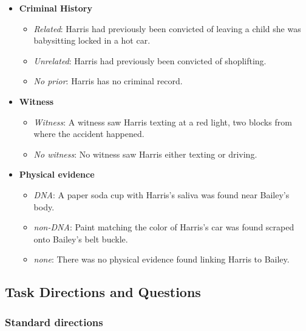 \documentclass[
]{article}
\providecommand{\tightlist}{%
  \setlength{\itemsep}{0pt}\setlength{\parskip}{0pt}}
\begin{document}
\begin{itemize}
\tightlist
\item
  \textbf{Criminal History}

  \begin{itemize}
  \tightlist
  \item
    \emph{Related}: Harris had previously been convicted of leaving a
    child she was babysitting locked in a hot car.
  \item
    \emph{Unrelated}: Harris had previously been convicted of
    shoplifting.
  \item
    \emph{No prior}: Harris has no criminal record.
  \end{itemize}
\item
  \textbf{Witness}

  \begin{itemize}
  \tightlist
  \item
    \emph{Witness}: A witness saw Harris texting at a red light, two
    blocks from where the accident happened.
  \item
    \emph{No witness}: No witness saw Harris either texting or driving.
  \end{itemize}
\item
  \textbf{Physical evidence}

  \begin{itemize}
  \tightlist
  \item
    \emph{DNA}: A paper soda cup with Harris's saliva was found near
    Bailey's body.
  \item
    \emph{non-DNA}: Paint matching the color of Harris's car was found
    scraped onto Bailey's belt buckle.
  \item
    \emph{none}: There was no physical evidence found linking Harris to
    Bailey.
  \end{itemize}
\end{itemize}

\hypertarget{task-directions-and-questions}{%
\subsection{Task Directions and
Questions}\label{task-directions-and-questions}}

\hypertarget{standard-directions}{%
\subsubsection{Standard directions}\label{standard-directions}}
\end{document}
